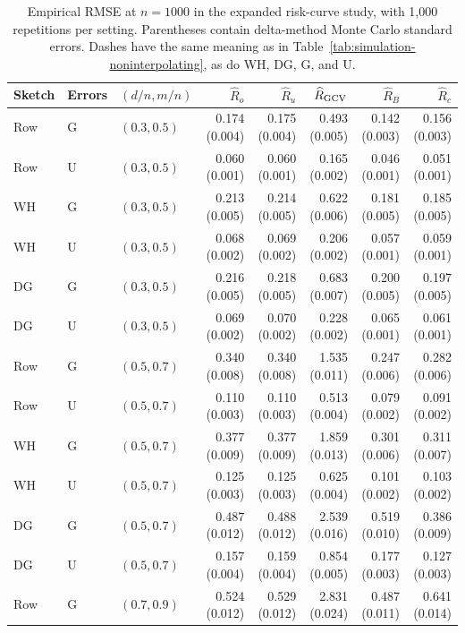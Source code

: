 \documentclass{article}
\theoremstyle{plain}
\theoremstyle{definition}
\theoremstyle{definition}
\begin{document}
\begin{table}[tb]
    \centering
    \footnotesize
    \setlength{\tabcolsep}{2.5pt}
    \caption{Empirical RMSE at $n=1000$ in the expanded risk-curve
    study, with 1,000 repetitions per setting. Parentheses contain
    delta-method Monte Carlo standard errors. Dashes have the same
    meaning as in Table~\ref{tab:simulation-noninterpolating}, as do
    WH, DG, G, and U.}
    \label{tab:appendix-accuracy-rmse}
\begin{tabular}{@{}lllrrrrr@{}}
\toprule
Sketch & Errors & $(d/n,m/n)$ & $\widehat R_o$ & $\widehat R_u$ & $\widehat R_{\rm GCV}$ & $\widehat R_B$ & $\widehat R_c$ \\
\midrule
Row & G & $(0.3,0.5)$ & 0.174 (0.004) & 0.175 (0.004) & 0.493 (0.005) & 0.142 (0.003) & 0.156 (0.003) \\
Row & U & $(0.3,0.5)$ & 0.060 (0.001) & 0.060 (0.001) & 0.165 (0.002) & 0.046 (0.001) & 0.051 (0.001) \\
WH & G & $(0.3,0.5)$ & 0.213 (0.005) & 0.214 (0.005) & 0.622 (0.006) & 0.181 (0.005) & 0.185 (0.005) \\
WH & U & $(0.3,0.5)$ & 0.068 (0.002) & 0.069 (0.002) & 0.206 (0.002) & 0.057 (0.001) & 0.059 (0.001) \\
DG & G & $(0.3,0.5)$ & 0.216 (0.005) & 0.218 (0.005) & 0.683 (0.007) & 0.200 (0.005) & 0.197 (0.005) \\
DG & U & $(0.3,0.5)$ & 0.069 (0.002) & 0.070 (0.002) & 0.228 (0.002) & 0.065 (0.001) & 0.061 (0.001) \\
\midrule
Row & G & $(0.5,0.7)$ & 0.340 (0.008) & 0.340 (0.008) & 1.535 (0.011) & 0.247 (0.006) & 0.282 (0.006) \\
Row & U & $(0.5,0.7)$ & 0.110 (0.003) & 0.110 (0.003) & 0.513 (0.004) & 0.079 (0.002) & 0.091 (0.002) \\
WH & G & $(0.5,0.7)$ & 0.377 (0.009) & 0.377 (0.009) & 1.859 (0.013) & 0.301 (0.006) & 0.311 (0.007) \\
WH & U & $(0.5,0.7)$ & 0.125 (0.003) & 0.125 (0.003) & 0.625 (0.004) & 0.101 (0.002) & 0.103 (0.002) \\
DG & G & $(0.5,0.7)$ & 0.487 (0.012) & 0.488 (0.012) & 2.539 (0.016) & 0.519 (0.010) & 0.386 (0.009) \\
DG & U & $(0.5,0.7)$ & 0.157 (0.004) & 0.159 (0.004) & 0.854 (0.005) & 0.177 (0.003) & 0.127 (0.003) \\
\midrule
Row & G & $(0.7,0.9)$ & 0.524 (0.012) & 0.529 (0.012) & 2.831 (0.024) & 0.487 (0.011) & 0.641 (0.014) \\

\end{tabular}
\end{table}
\end{document}
